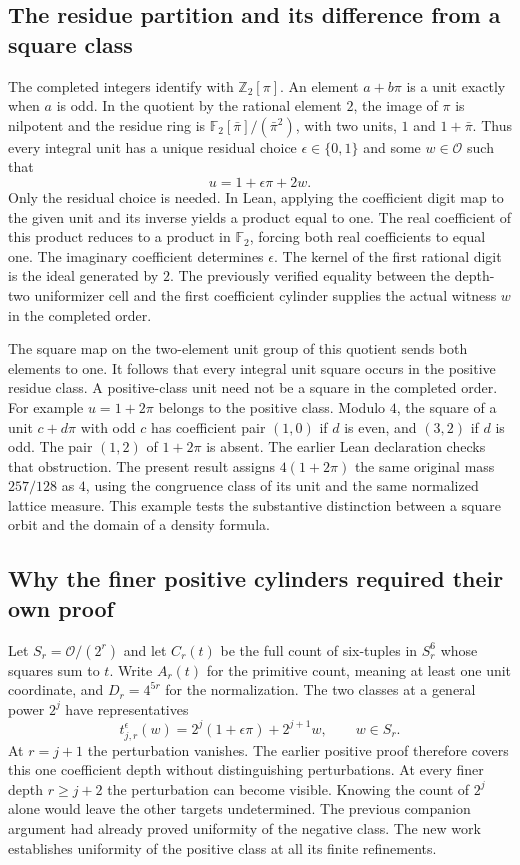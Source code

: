 \documentclass[12pt,letterpaper]{article}
\newcommand{\code}[1]{\texttt{\detokenize{#1}}}
\begin{document}
\subsection{The residue partition and its difference from a square class}
The completed integers identify with $\mathbb Z_2[\pi]$. An element $a+b\pi$ is a unit exactly when $a$ is odd. In the quotient by the rational element $2$, the image of $\pi$ is nilpotent and the residue ring is $\mathbb F_2[\bar\pi]/(\bar\pi^2)$, with two units, $1$ and $1+\bar\pi$. Thus every integral unit has a unique residual choice $\epsilon\in\{0,1\}$ and some $w\in\mathcal O$ such that
\[
u=1+\epsilon\pi+2w.
\]
Only the residual choice is needed. In Lean, applying the coefficient digit map to the given unit and its inverse yields a product equal to one. The real coefficient of this product reduces to a product in $\mathbb F_2$, forcing both real coefficients to equal one. The imaginary coefficient determines $\epsilon$. The kernel of the first rational digit is the ideal generated by $2$. The previously verified equality between the depth-two uniformizer cell and the first coefficient cylinder supplies the actual witness $w$ in the completed order.

The square map on the two-element unit group of this quotient sends both elements to one. It follows that every integral unit square occurs in the positive residue class. A positive-class unit need not be a square in the completed order. For example $u=1+2\pi$ belongs to the positive class. Modulo $4$, the square of a unit $c+d\pi$ with odd $c$ has coefficient pair $(1,0)$ if $d$ is even, and $(3,2)$ if $d$ is odd. The pair $(1,2)$ of $1+2\pi$ is absent. The earlier Lean declaration \code{RamDilate.Near.twist_nonsquare} checks that obstruction. The present result assigns $4(1+2\pi)$ the same original mass $257/128$ as $4$, using the congruence class of its unit and the same normalized lattice measure. This example tests the substantive distinction between a square orbit and the domain of a density formula.

\subsection{Why the finer positive cylinders required their own proof}
Let $S_r=\mathcal O/(2^r)$ and let $C_r(t)$ be the full count of six-tuples in $S_r^6$ whose squares sum to $t$. Write $A_r(t)$ for the primitive count, meaning at least one unit coordinate, and $D_r=4^{5r}$ for the normalization. The two classes at a general power $2^j$ have representatives
\[
t_{j,r}^{\epsilon}(w)=2^j(1+\epsilon\pi)+2^{j+1}w,\qquad w\in S_r.
\]
At $r=j+1$ the perturbation vanishes. The earlier positive proof therefore covers this one coefficient depth without distinguishing perturbations. At every finer depth $r\geq j+2$ the perturbation can become visible. Knowing the count of $2^j$ alone would leave the other targets undetermined. The previous companion argument had already proved uniformity of the negative class. The new work establishes uniformity of the positive class at all its finite refinements.
\end{document}
